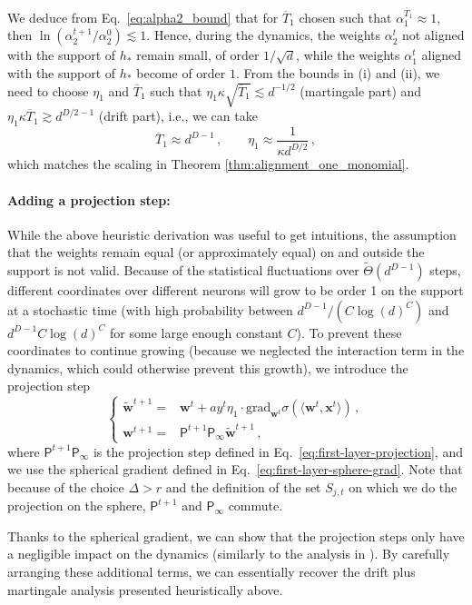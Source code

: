 \documentclass[11pt]{article}
\newcommand{\<}{\langle}
\renewcommand{\>}{\rangle}
\theoremstyle{definition}
\def\bw{{\boldsymbol w}}
\def\bx{{\boldsymbol x}}
\def\proj{{\mathsf P}}
\def\proj{{\mathsf P}}
\def\proj{{\mathsf P}}
\def\proj{{\mathsf P}}
\def\proj{{\mathsf P}}
\def\bw{{\boldsymbol w}}
\def\bx{{\boldsymbol x}}
\def\proj{{\mathsf P}}
\def\tbw{\widetilde \bw}
\def\oT{\overline{T}}
\def\grad{\text{grad}}
\def\tbw{\widetilde{\bw}}
\begin{document}
We deduce from Eq.~\eqref{eq:alpha2_bound} that for $\oT_1$ chosen such that $\alpha^{\oT_1}_1 \approx 1$, then $\ln ( \alpha_2^{t+1} / \alpha_2^0) \lesssim 1$. Hence, during the dynamics, the weights $\alpha_2^t$ not aligned with the support of $h_*$ remain small, of order $1/\sqrt{d}$, while the weights $\alpha_1^t$ aligned with the support of $h_*$ become of order $1$.
From the bounds in (i) and (ii), we need to choose $\eta_1 $ and $\oT_1$ such that $\eta_1 \kappa \sqrt{\oT_1} \lesssim d^{-1/2}$ (martingale part) and $\eta_1 \kappa \oT_1 \gtrsim d^{D/2 - 1}$ (drift part), i.e., we can take
\[
\oT_1 \approx   d^{D - 1}\, , \qquad \eta_1 \approx \frac{1}{\kappa d^{D/2}} \, , 
\]
which matches the scaling in Theorem \ref{thm:alignment_one_monomial}.

\paragraph*{Adding a projection step:} While the above heuristic derivation was useful to get intuitions, the assumption that the weights remain equal (or approximately equal) on and outside the support is not valid. Because of the statistical fluctuations over $\widetilde{\Theta} (d^{D - 1})$ steps, different coordinates over different neurons will grow to be order 1 on the support at a stochastic time (with high probability between $d^{D - 1}/(C \log(d)^C)$ and $d^{D - 1}C \log(d)^C$ for some large enough constant $C$). To prevent these coordinates to continue growing (because we neglected the interaction term in the dynamics, which could otherwise prevent this growth), we introduce the projection step
\begin{equation}\label{eq:correlation_dynamics_oneM}
\begin{cases}
\tbw^{t+1} =& \bw^t + a y^t  \eta_1 \cdot \grad_{\bw^t} \sigma ( \< \bw^t, \bx^t \>) \, ,\\
\bw^{t+1} = & \proj^{t+1} \proj_{\infty}  \tbw^{t+1}  \, ,
\end{cases}
\end{equation}
where $\proj^{t+1} \proj_{\infty}$ is the projection step defined in Eq.~\eqref{eq:first-layer-projection}, and we use the spherical gradient defined in Eq.~\eqref{eq:first-layer-sphere-grad}. Note that because of the choice $\Delta > r$ and the definition of the set $S_{j,t}$ on which we do the projection on the sphere, $\proj^{t+1}$ and $ \proj_{\infty}$ commute.

Thanks to the spherical gradient, we can show that the projection steps only have a negligible impact on the dynamics (similarly to the analysis in \cite{arous2021online}). By carefully arranging these additional terms, we can essentially recover the drift plus martingale analysis presented heuristically above.
\end{document}

